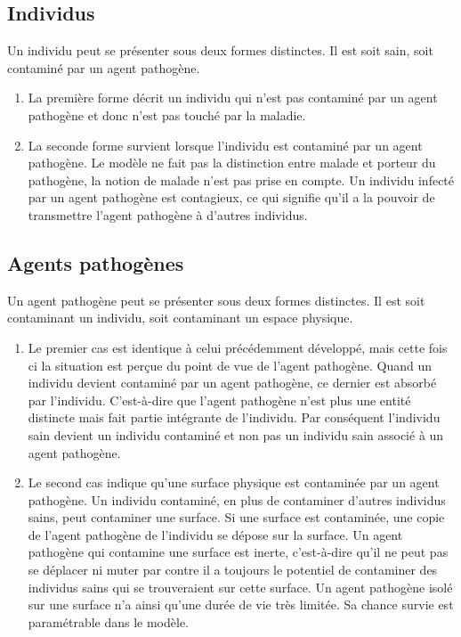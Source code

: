 \subsection{Individus}

Un individu peut se présenter sous deux formes distinctes. Il est soit sain, soit contaminé par un agent pathogène.\\

\begin{enumerate}
	\item La première forme décrit un individu qui n'est pas contaminé par un agent pathogène et donc n'est pas touché par la maladie.
	\item La seconde forme survient lorsque l'individu est contaminé par un agent pathogène. Le modèle ne fait pas la distinction entre malade et porteur du pathogène, la notion de malade n'est pas prise en compte. Un individu infecté par un agent pathogène est contagieux, ce qui signifie qu'il a la pouvoir de transmettre l'agent pathogène à d'autres individus.
\end{enumerate}

\subsection{Agents pathogènes}

Un agent pathogène peut se présenter sous deux formes distinctes. Il est soit contaminant un individu, soit contaminant un espace physique.

\begin{enumerate}
\item Le premier cas est identique à celui précédemment développé, mais cette fois ci la situation est perçue du point de vue de l'agent pathogène. Quand un individu devient contaminé par un agent pathogène, ce dernier est absorbé par l'individu. C'est-à-dire que l'agent pathogène n'est plus une entité distincte mais fait partie intégrante de l'individu. Par conséquent l'individu sain devient un individu contaminé et non pas un individu sain associé à un agent pathogène.
\item Le second cas indique qu'une surface physique est contaminée par un agent pathogène. Un individu contaminé, en plus de contaminer d'autres individus sains, peut contaminer une surface. Si une surface est contaminée, une copie de l'agent pathogène de l'individu se dépose sur la surface. Un agent pathogène qui contamine une surface est inerte, c'est-à-dire qu'il ne peut pas se déplacer ni muter par contre il a toujours le potentiel de contaminer des individus sains qui se trouveraient sur cette surface. Un agent pathogène isolé sur une surface n'a ainsi qu'une durée de vie très limitée. Sa chance survie est paramétrable dans le modèle.
\end{enumerate}


